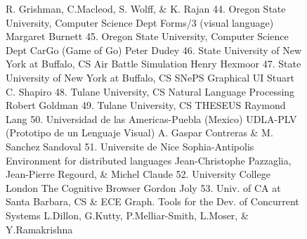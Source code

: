 \begin{figure}
\begin{figcol}
      R. Grishman, C.Macleod, S. Wolff, \& K. Rajan
44. Oregon State University, Computer Science Dept
      Forms/3 (visual language)
      Margaret Burnett
45. Oregon State University, Computer Science Dept
      CarGo (Game of Go)
      Peter Dudey
46. State University of New York at Buffalo, CS
      Air Battle Simulation
      Henry Hexmoor
47. State University of New York at Buffalo, CS
      SNePS Graphical UI
      Stuart C. Shapiro
48. Tulane University, CS
      Natural Language Processing
      Robert Goldman
49. Tulane University, CS
      THESEUS
      Raymond Lang
50. Universidad de las Americas-Puebla (Mexico)
      UDLA-PLV (Prototipo de un Lenguaje Visual)
      A. Gaspar Contreras \& M. Sanchez Sandoval
51. Universite de Nice Sophia-Antipolis
      Environment for distributed languages
      Jean-Christophe Pazzaglia, Jean-Pierre Regourd,
         \& Michel Claude
52. University College London
      The Cognitive Browser
      Gordon Joly
53. Univ. of CA at Santa Barbara, CS \& ECE
      Graph. Tools for the Dev. of Concurrent Systems
      L.Dillon, G.Kutty, P.Melliar-Smith, L.Moser,
         \& Y.Ramakrishna


\end{figcol}
\end{figure}
